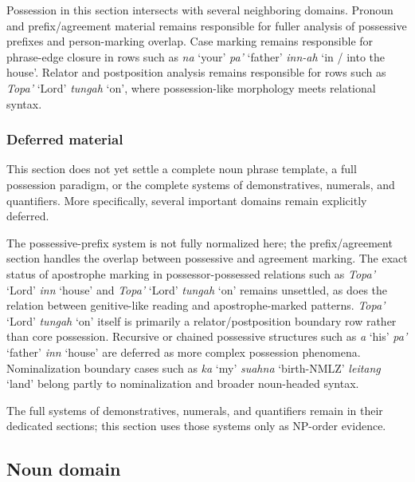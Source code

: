 \documentclass[
  11pt,
  a4paper,
]{article}
\newcommand{\tdim}[1]{\textit{#1}}
\newcommand{\glossquote}[1]{`#1'}
\begin{document}
Possession in this section intersects with several neighboring domains.
Pronoun and prefix/agreement material remains responsible for fuller
analysis of possessive prefixes and person-marking overlap. Case marking
remains responsible for phrase-edge closure in rows such as \tdim{na}
\glossquote{your} \tdim{pa'} \glossquote{father} \tdim{inn-ah}
\glossquote{in / into the house}. Relator and postposition analysis
remains responsible for rows such as \tdim{Topa'} \glossquote{Lord}
\tdim{tungah} \glossquote{on}, where possession-like morphology meets
relational syntax.

\subsubsection{Deferred material}\label{deferred-material-2}

This section does not yet settle a complete noun phrase template, a full
possession paradigm, or the complete systems of demonstratives,
numerals, and quantifiers. More specifically, several important domains
remain explicitly deferred.

The possessive-prefix system is not fully normalized here; the
prefix/agreement section handles the overlap between possessive and
agreement marking. The exact status of apostrophe marking in
possessor-possessed relations such as \tdim{Topa'} \glossquote{Lord}
\tdim{inn} \glossquote{house} and \tdim{Topa'} \glossquote{Lord}
\tdim{tungah} \glossquote{on} remains unsettled, as does the relation
between genitive-like reading and apostrophe-marked patterns.
\tdim{Topa'} \glossquote{Lord} \tdim{tungah} \glossquote{on} itself is
primarily a relator/postposition boundary row rather than core
possession. Recursive or chained possessive structures such as \tdim{a}
\glossquote{his} \tdim{pa'} \glossquote{father} \tdim{inn}
\glossquote{house} are deferred as more complex possession phenomena.
Nominalization boundary cases such as \tdim{ka} \glossquote{my}
\tdim{suahna} \glossquote{birth-NMLZ} \tdim{leitang} \glossquote{land}
belong partly to nominalization and broader noun-headed syntax.

The full systems of demonstratives, numerals, and quantifiers remain in
their dedicated sections; this section uses those systems only as
NP-order evidence.

\subsection{Noun domain}\label{noun-domain}
\end{document}
